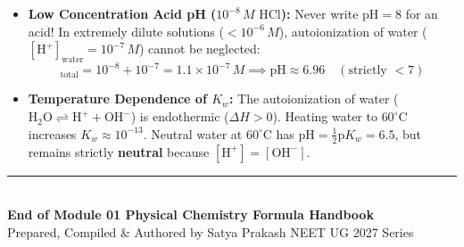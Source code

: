 \documentclass[11pt,a4paper]{article}
\begin{document}
\begin{trapbox}
\begin{itemize}
  \item \textbf{Low Concentration Acid pH ($10^{-8}\,\si{M}\text{ HCl}$):} Never write $\text{pH} = 8$ for an acid! In extremely dilute solutions ($< 10^{-6}\,\si{M}$), autoionization of water ($[\text{H}^+]_{\text{water}} = 10^{-7}\,\si{M}$) cannot be neglected:
  \begin{equation*}
    [\text{H}^+]_{\text{total}} = 10^{-8} + 10^{-7} = 1.1\times 10^{-7}\,\si{M} \implies \text{pH} \approx 6.96 \quad (\text{strictly } < 7)
  \end{equation*}
  \item \textbf{Temperature Dependence of $K_w$:} The autoionization of water ($\text{H}_2\text{O} \rightleftharpoons \text{H}^+ + \text{OH}^-$) is endothermic ($\Delta H > 0$). Heating water to $60^\circ\text{C}$ increases $K_w \approx 10^{-13}$. Neutral water at $60^\circ\text{C}$ has $\text{pH} = \frac{1}{2}\text{p}K_w = 6.5$, but remains strictly \textbf{neutral} because $[\text{H}^+] = [\text{OH}^-]$.
\end{itemize}
\end{trapbox}

\vspace{15pt}
\begin{center}
  \rule{0.6\textwidth}{0.8pt}\\[6pt]
  {\small\textbf{\color{primarydark}End of Module 01 Physical Chemistry Formula Handbook}}\\[2pt]
  {\footnotesize\color{accentblue}Prepared, Compiled \& Authored by Satya Prakash \quad\textbar\quad NEET UG 2027 Series}
\end{center}
\end{document}

